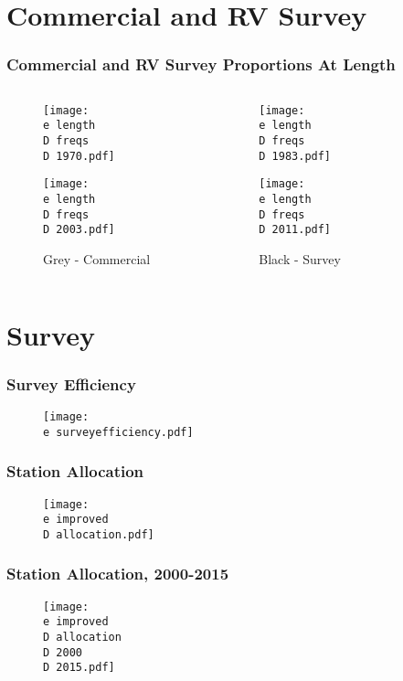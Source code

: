 \documentclass{beamer}
\begin{document}
\section{Commercial and RV Survey}
\begin{frame}
\frametitle{Commercial and RV Survey Proportions At Length }
\vspace{-0.75cm}
\begin{figure}
\centering
\begin{columns}
\begin{column}{0.5\textwidth}
 \centerline{\texttt{[image: \\e length\\D freqs\\D 1970.pdf]}}
\centerline{\texttt{[image: \\e length\\D freqs\\D 2003.pdf]}}
\centerline{\tiny Grey - Commercial}
\end{column}
\begin{column}{0.5\textwidth}
\centerline{\texttt{[image: \\e length\\D freqs\\D 1983.pdf]}}
\centerline{\texttt{[image: \\e length\\D freqs\\D 2011.pdf]}}
\centerline{\tiny Black - Survey}

\end{column}
\end{columns}
 \end{figure}
 \end{frame}

\section{Survey}
\begin{frame}
\frametitle{Survey Efficiency}
\vspace{-1cm}
\begin{figure}
\centering
 \centerline{\texttt{[image: \\e surveyefficiency.pdf]}}

 \end{figure}
 \end{frame}


\begin{frame}
\frametitle{Station Allocation}
\vspace{-1cm}
\begin{figure}
\centering
 \centerline{\texttt{[image: \\e improved\\D allocation.pdf]}}

 \end{figure}
 \end{frame}
\begin{frame}
\frametitle{Station Allocation, 2000-2015}
\vspace{-1cm}
\begin{figure}
\centering
 \centerline{\texttt{[image: \\e improved\\D allocation\\D 2000\\D 2015.pdf]}}

 \end{figure}
 \end{frame}
\end{document}
